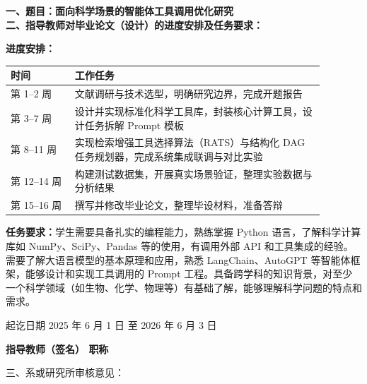 \cleardoublepage{}

{
    \bfseries
    \noindent 一、题目：面向科学场景的智能体工具调用优化研究\\[1ex]
    \noindent 二、指导教师对毕业论文（设计）的进度安排及任务要求：

    \mdseries\normalsize

    \textbf{进度安排：}

    \vspace{0.5ex}
    \small
    \begin{tabular}{p{0.18\linewidth}p{0.70\linewidth}}
        \toprule
        时间 & 工作任务 \\
        \midrule
        第 1--2 周  & 文献调研与技术选型，明确研究边界，完成开题报告 \\[0.3ex]
        第 3--7 周  & 设计并实现标准化科学工具库，封装核心计算工具，设计任务拆解 Prompt 模板 \\[0.3ex]
        第 8--11 周 & 实现检索增强工具选择算法（RATS）与结构化 DAG 任务规划器，完成系统集成联调与对比实验 \\[0.3ex]
        第 12--14 周 & 构建测试数据集，开展真实场景验证，整理实验数据与分析结果 \\[0.3ex]
        第 15--16 周 & 撰写并修改毕业论文，整理毕设材料，准备答辩 \\
        \bottomrule
    \end{tabular}

    \vspace{1.5ex}
    \textbf{任务要求：}学生需要具备扎实的编程能力，熟练掌握 Python 语言，了解科学计算库如 NumPy、SciPy、Pandas 等的使用，有调用外部 API 和工具集成的经验。需要了解大语言模型的基本原理和应用，熟悉 LangChain、AutoGPT 等智能体框架，能够设计和实现工具调用的 Prompt 工程。具备跨学科的知识背景，对至少一个科学领域（如生物、化学、物理等）有基础了解，能够理解科学问题的特点和需求。

    \vspace{1ex}
    \noindent 起讫日期 2025 年 6 月 1 日 至 2026 年 6 月 3 日
    \begin{flushright}
        \bfseries {}
            指导教师（签名） \underline{} 职称 \underline{}
    \end{flushright}

    \noindent 三、系或研究所审核意见：\\

    \mbox{} \vfill
    \signature{负责人（签名）}
}

